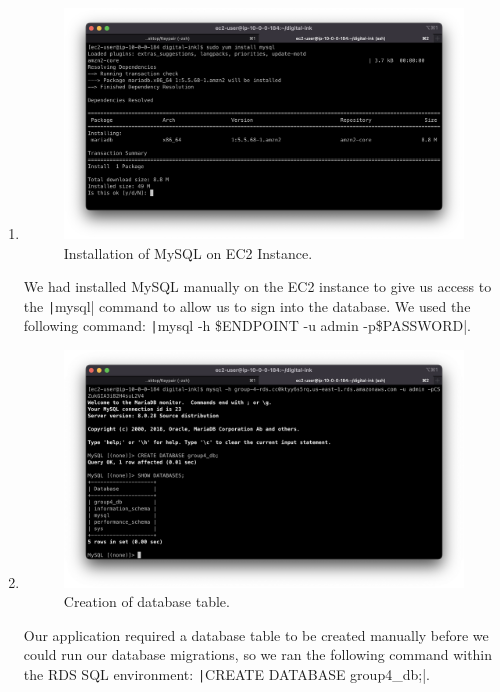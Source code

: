 \begin{enumerate}
    \item
    \begin{figure}[H]
    \centering
    \includegraphics[width=\textwidth]{resources/rds/rds-mysql-install}
    \caption{Installation of MySQL on EC2 Instance.}
    \label{fig:rds-msql-install}
    \end{figure}
    We had installed MySQL manually on the EC2 instance to give us access to the \texttt|mysql| command to allow us to sign into the database. We used the following command: \texttt|mysql -h \$ENDPOINT -u admin -p\$PASSWORD|.

    \item
    \begin{figure}[H]
    \centering
    \includegraphics[width=\textwidth]{resources/rds/rds-database-creation}
    \caption{Creation of database table.}
    \label{fig:rds-db-create-2}
    \end{figure}
    Our application required a database table to be created manually before we could run our database migrations, so we ran the following command within the RDS SQL environment: \texttt|CREATE DATABASE group4_db;|.


\end{enumerate}
